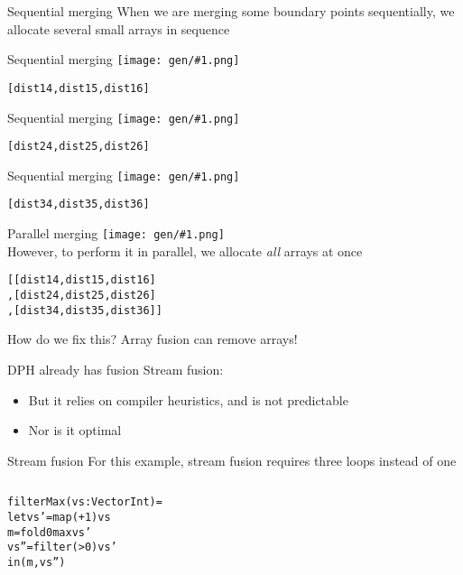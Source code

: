 \documentclass{beamer}
\newcommand{\bl}[1]{\textcolor[rgb]{0.0,0.5,0.9}{#1}}
\newcommand{\g}[1]{\textcolor[rgb]{0.7,0.3,0.3}{#1}}
\newcommand{\fr}[1]{\begin{frame}[fragile]{#1}}
\newcommand{\im}[1]{\texttt{[image: gen/\#1.png]} \\ }
\begin{document}
\fr{Sequential merging}
When we are merging some boundary points sequentially,
we allocate several small arrays in sequence
\end{frame}

\fr{Sequential merging}
\im{merge-01}
\begin{alltt}
[ dist 1 4, dist 1 5, dist 1 6 ]
\end{alltt}
\end{frame}

\fr{Sequential merging}
\im{merge-02}
\begin{alltt}
[ dist 2 4, dist 2 5, dist 2 6 ]
\end{alltt}
\end{frame}

\fr{Sequential merging}
\im{merge-03}
\begin{alltt}
[ dist 3 4, dist 3 5, dist 3 6 ]
\end{alltt}
\end{frame}


\fr{Parallel merging}
\im{merge-par}
However, to perform it in parallel, we allocate \emph{all} arrays at once
\begin{alltt}
[ [dist 1 4, dist 1 5, dist 1 6]
, [dist 2 4, dist 2 5, dist 2 6]
, [dist 3 4, dist 3 5, dist 3 6] ]
\end{alltt}
\end{frame}

\fr{How do we fix this?}
Array fusion can remove arrays!
\end{frame}

\fr{DPH already has fusion}
Stream fusion:
\begin{itemize}
\item
But it relies on compiler heuristics, and is not predictable
\item
Nor is it optimal
\end{itemize}
\end{frame}

\fr{Stream fusion}
For this example, stream fusion requires three loops instead of one
\begin{columns}
\column{6cm}
\begin{alltt}
filterMax (\bl{vs} : Vector Int) =
 let \bl{vs'} = \g{map}    (+1)    \bl{vs}
     \bl{m}   = \g{fold}     0 max \bl{vs'}
     \bl{vs''}= \g{filter} (>0)    \bl{vs'}
 in (\bl{m}, \bl{vs''})
\end{alltt}
\column{4cm}
\end{columns}
\end{frame}
\end{document}
